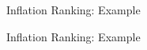 \documentclass[xcolor=dvipsnames]{beamer}
\begin{document}
\begin{frame}{Inflation Ranking: Example}
\begin{figure}
\end{figure}
\end{frame}

\begin{frame}{Inflation Ranking: Example}
\begin{figure}
\end{figure}
\end{frame}
\end{document}
